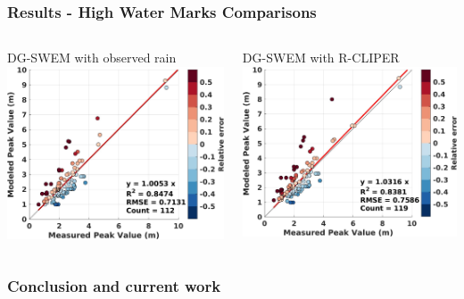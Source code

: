 \documentclass[10pt]{oden_beamer}
\begin{document}
\begin{frame}
  \frametitle{Results - High Water Marks Comparisons}
  \begin{columns}
    \centering
    \vspace{0.5cm}
    \centering
    DG-SWEM with observed rain
    \includegraphics[width=\linewidth]{2008_owi.jpg}

    \centering
    \vspace{0.5cm}
    \centering
    DG-SWEM with R-CLIPER
    \includegraphics[width=\linewidth]{2008_rain.jpg}

  \end{columns}
\end{frame}
\begin{frame}
  \frametitle{Conclusion and current work}
\end{frame}
\end{document}
